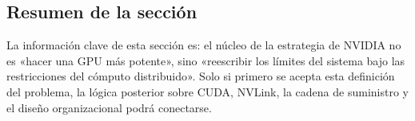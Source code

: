 \subsection{Resumen de la sección}

La información clave de esta sección es: el núcleo de la estrategia de NVIDIA no es «hacer una GPU más potente», sino «reescribir los límites del sistema bajo las restricciones del cómputo distribuido». Solo si primero se acepta esta definición del problema, la lógica posterior sobre CUDA, NVLink, la cadena de suministro y el diseño organizacional podrá conectarse.
